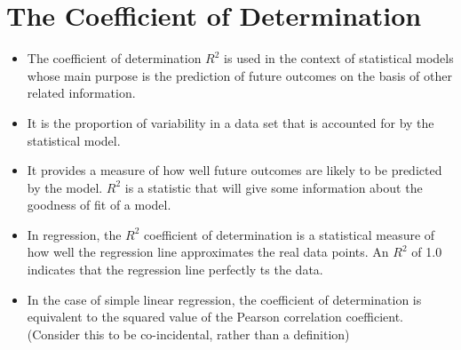 \documentclass[]{report}
\begin{document}
\section*{The Coefficient of Determination}
\begin{itemize}
	
	\item  The coefficient of determination $R^2$ is used in the context of statistical models whose main purpose is
	the prediction of future outcomes on the basis of other related information.
	\item  It is the proportion of variability in a data set that is accounted for by the statistical model.
	\item  It provides a measure of how well future outcomes are likely to be predicted by the model. $R^2$ is a
	statistic that will give some information about the goodness of fit of a model.
	\item  In regression, the $R^2$ coefficient of determination is a statistical measure of how well the regression line
	approximates the real data points. An $R^2$ of 1.0 indicates that the regression line perfectly ts the data.
	\item  In the case of simple linear regression, the coefficient of determination is equivalent to the squared value
	of the Pearson correlation coefficient. (Consider this to be co-incidental, rather than a definition)
\end{itemize}
\newpage
\end{document}
